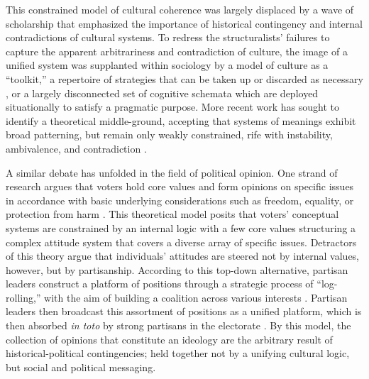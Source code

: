 \documentclass{article} %
\begin{document}
This constrained model of cultural coherence was largely displaced by a
wave of scholarship that emphasized the importance of historical
contingency and internal contradictions of cultural systems. To redress
the structuralists' failures to capture the apparent arbitrariness and
contradiction of culture, the image of a unified system was supplanted
within sociology by a model of culture as a ``toolkit,'' a repertoire of
strategies that can be taken up or discarded as necessary
\parencite{Swidler2003-il}, or a largely
disconnected set of cognitive schemata which are deployed situationally
\parencite{DiMaggio1997-rx} to satisfy a
pragmatic purpose. More recent work has sought to identify a theoretical
middle-ground, accepting that systems of meanings exhibit broad
patterning, but remain only weakly constrained, rife with instability,
ambivalence, and contradiction
\parencite{Baldassarri2014-mi, Boutyline2017-vj, Kiley2020-hi, Rawlings2020-yb, Swidler2003-il}.

A similar debate has unfolded in the field of political opinion. One
strand of research argues that voters hold core values and form opinions
on specific issues in accordance with basic underlying considerations
such as freedom, equality, or protection from harm
\parencite{Feldman1992-lf, Goren2016-rw, Haidt2012-fy, Lakoff2010-yy}. This
theoretical model posits that voters' conceptual systems are constrained
by an internal logic with a few core values structuring a complex
attitude system that covers a diverse array of specific issues.
Detractors of this theory argue that individuals' attitudes are steered
not by internal values, however, but by partisanship. According to this
top-down alternative, partisan leaders construct a platform of positions
through a strategic process of ``log-rolling,'' with the aim of building
a coalition across various interests
\parencite{Carmines1989-yi, Zaller1992-eq}. Partisan leaders then broadcast this assortment of
positions as a unified platform, which is then absorbed \emph{in toto}
by strong partisans in the electorate
\parencite{Green2004-eq}. By this model, the collection of opinions that
constitute an ideology are the arbitrary result of historical-political
contingencies; held together not by a unifying cultural logic, but
social and political messaging.
\end{document}
